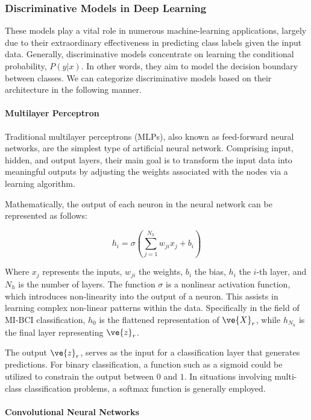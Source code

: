 \subsubsection{Discriminative Models in Deep Learning}

These models play a vital role in numerous machine-learning applications, largely due to their extraordinary effectiveness in predicting class labels given the input data. Generally, discriminative models concentrate on learning the conditional probability, $P(y|x)$. In other words, they aim to model the decision boundary between classes. We can categorize discriminative models based on their architecture in the following manner.

\paragraph{Multilayer Perceptron}

Traditional multilayer perceptrons (MLPs), also known as feed-forward neural networks, are the simplest type of artificial neural network. Comprising input, hidden, and output layers, their main goal is to transform the input data into meaningful outputs by adjusting the weights associated with the nodes via a learning algorithm.

Mathematically, the output of each neuron in the neural network can be represented as follows:

\begin{equation}
h_i = \sigma \left( \sum_{j=1}^{N_h} w_{ji} x_j + b_i \right)
\end{equation}

Where $x_j$ represents the inputs, $w_{ji}$ the weights, $b_i$ the bias, $h_i$ the $i$-th layer, and $N_h$ is the number of layers. The function $\sigma$ is a nonlinear activation function, which introduces non-linearity into the output of a neuron. This assists in learning complex non-linear patterns within the data. Specifically in the field of MI-BCI classification, $h_0$ is the flattened representation of $\ve{X}_r$, while $h_{N_h}$ is the final layer representing $\ve{z}_r$.

The output $\ve{z}_r$, serves as the input for a classification layer that generates predictions. For binary classification, a function such as a sigmoid could be utilized to constrain the output between $0$ and $1$. In situations involving multi-class classification problems, a softmax function is generally employed.

\paragraph{Convolutional Neural Networks}

